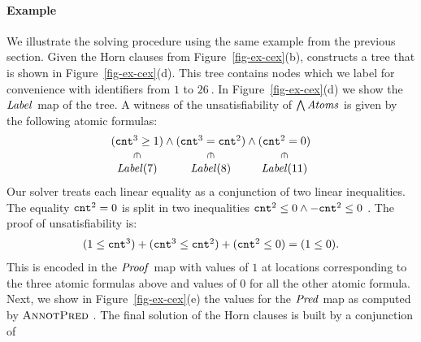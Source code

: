 \paragraph{Example}
We illustrate the solving procedure using the same example from the
previous section. 
Given the Horn clauses from Figure~\ref{fig-ex-cex}(b), \algMkHornTree
constructs a tree that is shown in Figure~\ref{fig-ex-cex}(d).
This tree contains nodes which we label for convenience with
identifiers from $1$ to $26\ $.
In Figure~\ref{fig-ex-cex}(d) we show the $\mathit{Label}$ map of the tree.
A witness of the unsatisfiability of $\bigwedge \mathit{Atoms}$ is given by the
following atomic formulas:
\begin{equation*}  
  \begin{array}[t]{l}
    \begin{array}[t]{@{}c@{}}
      (\local^{3} \geq 1 )\\
      {\downin}\\
      {\cFormulaOf{7}}    
    \end{array}
    \land 
    \begin{array}[t]{@{}c@{}}
      (\local^{3} = \local^{2})\\
      {\downin} \\ 
      {\cFormulaOf{8}}
    \end{array}
    \land 
    \begin{array}[t]{@{}c@{}}
      (\local^{2}=0)\\
      {\downin}\\ 
      {\cFormulaOf{11}}
    \end{array}
\end{array}\end{equation*}
Our solver treats each linear equality as a conjunction of two linear
inequalities.
The equality $\mathtt{cnt}^{2}=0$ is split in two inequalities
$\local^{2}\leq0\land -\local^{2}\leq0\ $.
The proof of unsatisfiability is:
%
\begin{equation*}  \begin{array}[t]{l}
(1 \leq \mathtt{cnt}^{3} )+
(\mathtt{cnt}^{3} \leq \mathtt{cnt}^{2} ) +
( \mathtt{cnt}^{2} \leq 0) = (1 \leq 0).
\end{array}\end{equation*}
%
This is encoded in the $\mathit{Proof}$ map with values of $1$ at locations
corresponding to the three atomic formulas above and values of $0$ for
all the other atomic formula.
Next, we show in Figure~\ref{fig-ex-cex}(e) the values for the
$\mathit{Pred}$ map as computed by $\textsc{AnnotPred}\ $.
The final solution of the Horn clauses is built by a conjunction of
